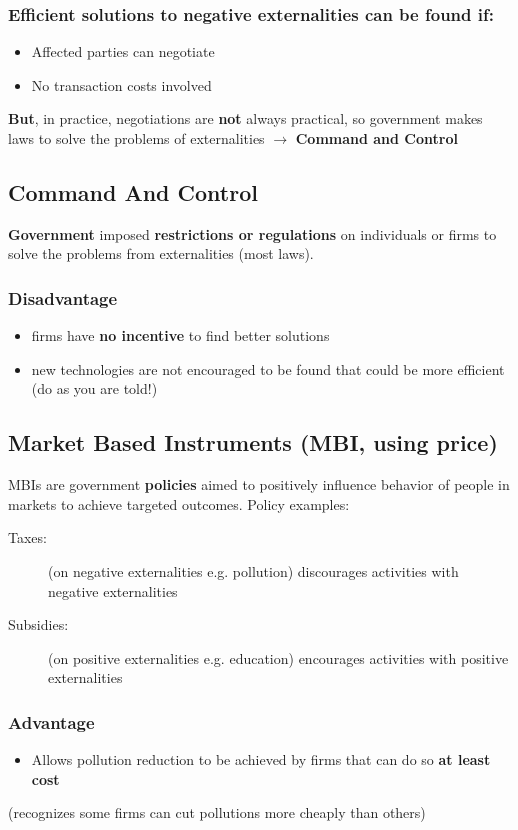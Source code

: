 \subsubsection{Efficient solutions to negative externalities can be found if:}
\begin{itemize}
	\item Affected parties can negotiate
	\item No transaction costs involved
\end{itemize}
\textbf{But}, in practice, negotiations are \textbf{not} always practical, so government makes laws to solve the problems of externalities $\rightarrow$ \textbf{Command and Control}

\subsection{Command And Control}
\textbf{Government} imposed \textbf{restrictions or regulations} on individuals or firms to solve the problems from externalities (most laws).
\subsubsection{Disadvantage}
\begin{itemize}
	\item firms have \textbf{no incentive} to find better solutions
	\item new technologies are not encouraged to be found that could be more efficient (do as you are told!)
\end{itemize}

\subsection{Market Based Instruments (MBI, using price)}
MBIs are government \textbf{policies} aimed to positively influence behavior of people in markets to achieve targeted outcomes. Policy examples:
\begin{description}
	\item[Taxes:] (on negative externalities e.g. pollution) discourages activities with negative externalities
	\item[Subsidies:] (on positive externalities e.g. education) encourages activities with positive externalities
\end{description}
\subsubsection{Advantage}
\begin{itemize}
	\item Allows pollution reduction to be achieved by firms that can do so \textbf{at least cost}
\end{itemize}
(recognizes some firms can cut pollutions more cheaply than others)
